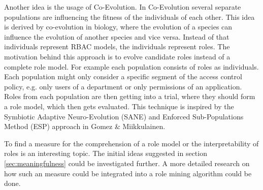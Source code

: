 Another idea is the usage of Co-Evolution. In Co-Evolution several separate populations are influencing the fitness of the individuals of each other. This idea is derived by co-evolution in biology, where the evolution of a species can influence the evolution of another species and vice versa. Instead of that individuals represent RBAC models, the individuals represent roles. The motivation behind this approach is to evolve candidate roles instead of a complete role model. For example each population consists of roles as individuals. Each population might only consider a specific segment of the access control policy, e.g. only users of a department or only permissions of an application. Roles from each population are then getting into a trial, where they should form a role model, which then gets evaluated. This technique is inspired by the Symbiotic Adaptive Neuro-Evolution (SANE) and Enforced Sub-Populations Method (ESP) approach in Gomez \& Miikkulainen\cite{Gomez:1999}.

To find a measure for the comprehension of a role model or the interpretability of roles is an interesting topic. The initial ideas suggested in section \ref{sec:meaningfulness} could be investigated further. A more detailed research on how such an measure could be integrated into a role mining algorithm could be done.

    